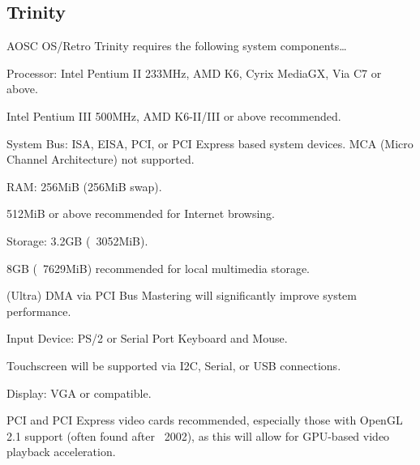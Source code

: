     \subsection{Trinity}

    AOSC OS/Retro Trinity requires the following system components\ldots

    \begin{compactitem}
    \item Processor: Intel Pentium II 233MHz, AMD K6, Cyrix MediaGX, Via C7 or above.
        \begin{compactitem}
        \item Intel Pentium III 500MHz, AMD K6-II/III or above recommended.
        \end{compactitem}
    \item System Bus: ISA, EISA, PCI, or PCI Express based system devices. MCA (Micro Channel Architecture) not supported.
    \item RAM: 256MiB (256MiB swap).
        \begin{compactitem}
        \item 512MiB or above recommended for Internet browsing.
        \end{compactitem}
    \item Storage: 3.2GB (~3052MiB).
        \begin{compactitem}
        \item 8GB (~7629MiB) recommended for local multimedia storage.
        \item (Ultra) DMA via PCI Bus Mastering will significantly improve system performance.
        \end{compactitem}
    \item Input Device: PS/2 or Serial Port Keyboard and Mouse.
        \begin{compactitem}
        \item Touchscreen will be supported via I2C, Serial, or USB connections.
        \end{compactitem}
    \item Display: VGA or compatible.
        \begin{compactitem}
        \item PCI and PCI Express video cards recommended, especially those with OpenGL 2.1 support (often found after ~2002), as this will allow for GPU-based video playback acceleration.
        \end{compactitem}
    \end{compactitem}


